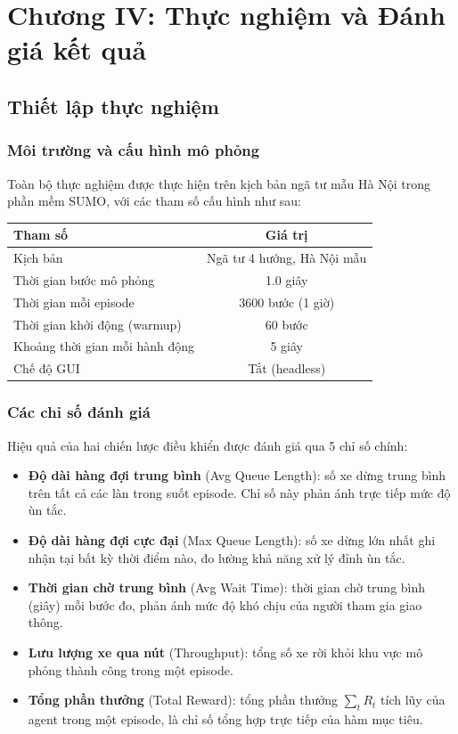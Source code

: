 \section{Chương IV: Thực nghiệm và Đánh giá kết quả}

\subsection{Thiết lập thực nghiệm}

\subsubsection{Môi trường và cấu hình mô phỏng}

Toàn bộ thực nghiệm được thực hiện trên kịch bản ngã tư mẫu Hà Nội trong phần mềm SUMO, với các tham số cấu hình như sau:

\begin{center}
\begin{tabular}{|l|c|}
\hline
\textbf{Tham số} & \textbf{Giá trị} \\
\hline
Kịch bản & Ngã tư 4 hướng, Hà Nội mẫu \\
Thời gian bước mô phỏng & 1.0 giây \\
Thời gian mỗi episode & 3600 bước (1 giờ) \\
Thời gian khởi động (warmup) & 60 bước \\
Khoảng thời gian mỗi hành động & 5 giây \\
Chế độ GUI & Tắt (headless) \\
\hline
\end{tabular}
\end{center}

\subsubsection{Các chỉ số đánh giá}

Hiệu quả của hai chiến lược điều khiển được đánh giá qua 5 chỉ số chính:

\begin{itemize}
    \item \textbf{Độ dài hàng đợi trung bình} (Avg Queue Length): số xe dừng trung bình trên tất cả các làn trong suốt episode. Chỉ số này phản ánh trực tiếp mức độ ùn tắc.

    \item \textbf{Độ dài hàng đợi cực đại} (Max Queue Length): số xe dừng lớn nhất ghi nhận tại bất kỳ thời điểm nào, đo lường khả năng xử lý đỉnh ùn tắc.

    \item \textbf{Thời gian chờ trung bình} (Avg Wait Time): thời gian chờ trung bình (giây) mỗi bước đo, phản ánh mức độ khó chịu của người tham gia giao thông.

    \item \textbf{Lưu lượng xe qua nút} (Throughput): tổng số xe rời khỏi khu vực mô phỏng thành công trong một episode.

    \item \textbf{Tổng phần thưởng} (Total Reward): tổng phần thưởng $\sum_t R_t$ tích lũy của agent trong một episode, là chỉ số tổng hợp trực tiếp của hàm mục tiêu.
\end{itemize}

